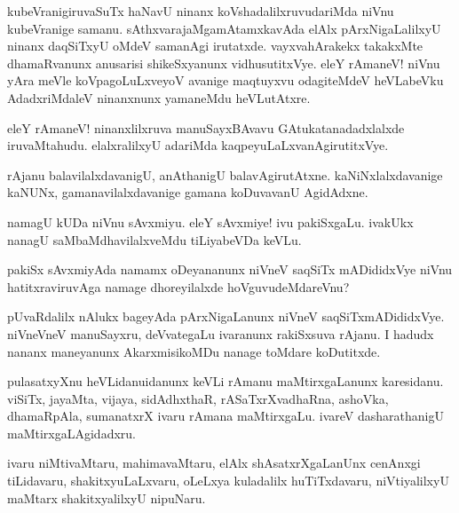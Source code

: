 \begin{mng}
kubeVranigiruvaSuTx haNavU ninanx koVshadalilxruvudariMda niVnu kubeVranige samanu. sAthxvarajaMgamAtamxkavAda elAlx pArxNigaLalilxyU ninanx daqSiTxyU oMdeV samanAgi irutatxde. vayxvahArakekx takakxMte dhamaRvanunx anusarisi shikeSxyanunx vidhusutitxVye. eleY rAmaneV! niVnu yAra meVle koVpagoLuLxveyoV avanige maqtuyxvu odagiteMdeV heVLabeVku AdadxriMdaleV ninanxnunx yamaneMdu heVLutAtxre.
\end{mng}

\begin{mng}
eleY rAmaneV! ninanxlilxruva manuSayxBAvavu GAtukatanadadxlalxde iruvaMtahudu. elalxralilxyU adariMda kaqpeyuLaLxvanAgirutitxVye.
\end{mng}

\begin{mng}
rAjanu balavilalxdavanigU, anAthanigU balavAgirutAtxne. kaNiNxlalxdavanige kaNUNx, gamanavilalxdavanige  gamana koDuvavanU AgidAdxne.
\end{mng}

\begin{mng}
namagU kUDa niVnu sAvxmiyu. eleY sAvxmiye! ivu pakiSxgaLu. ivakUkx nanagU saMbaMdhavilalxveMdu tiLiyabeVDa keVLu.
\end{mng}

\begin{mng}
pakiSx sAvxmiyAda namamx oDeyananunx niVneV saqSiTx mADididxVye niVnu hatitxraviruvAga namage dhoreyilalxde hoVguvudeMdareVnu?
\end{mng}

\begin{mng}
pUvaRdalilx nAlukx bageyAda pArxNigaLanunx niVneV saqSiTxmADididxVye. niVneVneV manuSayxru, deVvategaLu ivaranunx rakiSxsuva rAjanu. I hadudx nananx maneyanunx AkarxmisikoMDu nanage toMdare koDutitxde.
\end{mng}

\begin{mng}
pulasatxyXnu heVLidanu\mdash idanunx keVLi rAmanu maMtirxgaLanunx karesidanu. viSiTx, jayaMta, vijaya, sidAdhxthaR, rASaTxrXvadhaRna, ashoVka, dhamaRpAla, sumanatxrX ivaru rAmana maMtirxgaLu. ivareV dasharathanigU maMtirxgaLAgidadxru.
\end{mng}

\begin{mng}
ivaru niMtivaMtaru, mahimavaMtaru, elAlx shAsatxrXgaLanUnx cenAnxgi tiLidavaru, shakitxyuLaLxvaru, oLeLxya kuladalilx huTiTxdavaru, niVtiyalilxyU maMtarx shakitxyalilxyU nipuNaru.
\end{mng}

